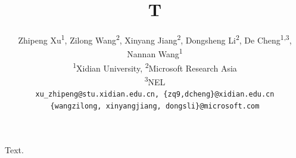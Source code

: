 \documentclass{article}
\title{T}
\author{Zhipeng Xu\textsuperscript{\rm 1}, Zilong Wang\textsuperscript{\rm 2}, Xinyang Jiang\textsuperscript{\rm 2},
Dongsheng Li\textsuperscript{\rm 2}, De Cheng\textsuperscript{\rm 1,3}, Nannan Wang\textsuperscript{\rm 1} \\
\textsuperscript{1}Xidian University,\; \textsuperscript{2}Microsoft Research Asia\; \\ \textsuperscript{3}NEL\; \\
\tt \small xu\_zhipeng@stu.xidian.edu.cn,  \{zq9,dcheng\}@xidian.edu.cn \\
\tt \small \{wangzilong, xinyangjiang, dongsli\}@microsoft.com}
\begin{document}
\maketitle
Text.
\end{document}
